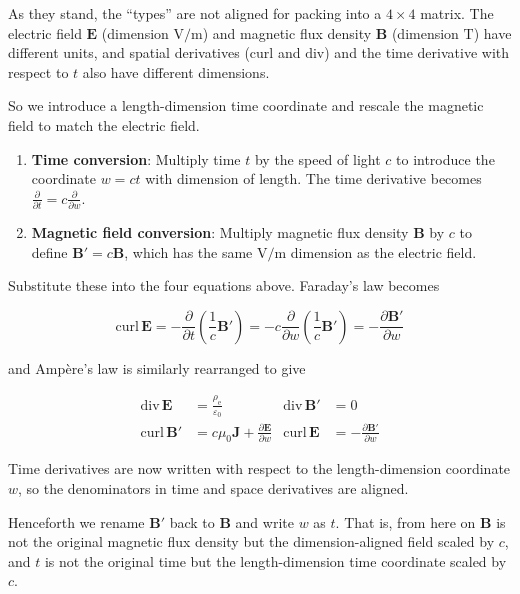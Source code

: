 \documentclass[a4paper,12pt,openany]{book}
\begin{document}
As they stand, the ``types'' are not aligned for packing into a
\(4\times4\) matrix. The electric field \(\mathbf{E}\) (dimension
\(\mathrm{V/m}\)) and magnetic flux density \(\mathbf{B}\) (dimension
\(\mathrm{T}\)) have different units, and spatial derivatives
(\(\mathrm{curl}\) and \(\mathrm{div}\)) and the time derivative with
respect to \(t\) also have different dimensions.

So we introduce a length-dimension time coordinate and rescale the
magnetic field to match the electric field.

\begin{enumerate}
\def\labelenumi{\arabic{enumi}.}
\item
  \textbf{Time conversion}: Multiply time \(t\) by the speed of light
  \(c\) to introduce the coordinate \(w = ct\) with dimension of length.
  The time derivative becomes
  \(\frac{\partial}{\partial t} = c\frac{\partial}{\partial w}\).
\item
  \textbf{Magnetic field conversion}: Multiply magnetic flux density
  \(\mathbf{B}\) by \(c\) to define \(\mathbf{B}' = c\mathbf{B}\), which
  has the same \(\mathrm{V/m}\) dimension as the electric field.
\end{enumerate}

Substitute these into the four equations above. Faraday's law becomes

\[\mathrm{curl}\,\mathbf{E} = -\frac{\partial}{\partial t}\!\left(\frac{1}{c}\mathbf{B}'\right) = -c\frac{\partial}{\partial w}\!\left(\frac{1}{c}\mathbf{B}'\right) = -\frac{\partial \mathbf{B}'}{\partial w}\]

and Ampère's law is similarly rearranged to give

\[\begin{aligned}
\mathrm{div}\,\mathbf{E} &= \frac{\rho_{\mathrm e}}{\varepsilon_0} &
\mathrm{div}\,\mathbf{B}' &= 0 \\[0.5em]
\mathrm{curl}\,\mathbf{B}' &= c\mu_0\mathbf{J} + \frac{\partial \mathbf{E}}{\partial w} &
\mathrm{curl}\,\mathbf{E} &= -\frac{\partial \mathbf{B}'}{\partial w}
\end{aligned}\]

Time derivatives are now written with respect to the length-dimension
coordinate \(w\), so the denominators in time and space derivatives are
aligned.

Henceforth we rename \(\mathbf{B}'\) back to \(\mathbf{B}\) and write
\(w\) as \(t\). That is, from here on \(\mathbf{B}\) is not the original
magnetic flux density but the dimension-aligned field scaled by \(c\),
and \(t\) is not the original time but the length-dimension time
coordinate scaled by \(c\).
\end{document}
